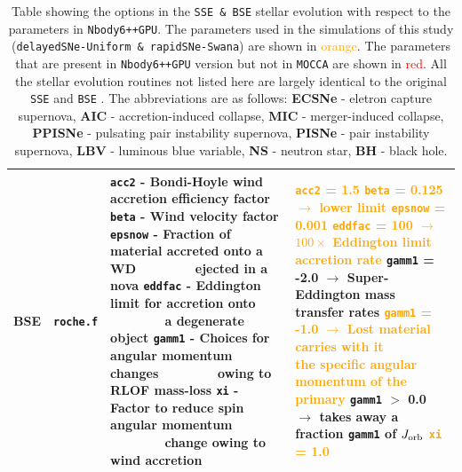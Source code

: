 \begin{landscape}
\begin{table}
\begin{tabular}{|l|l|l|l|}
				\hline \textbf{BSE} & \texttt{roche.f} & \makecell[l]{\texttt{acc2} - Bondi-Hoyle wind accretion efficiency factor \\ \texttt{beta} - Wind velocity factor \\ \texttt{epsnow} - Fraction of material accreted onto a WD \\ $\qquad\qquad$ ejected in a nova \\ \texttt{eddfac} - Eddington limit for accretion onto \\ $\qquad\qquad$ a degenerate object \\ \texttt{gamm1} - Choices for angular momentum changes \\ $\qquad\qquad$ owing to RLOF mass-loss \\ \texttt{xi} - Factor to reduce spin angular momentum \\ $\qquad\qquad$ change owing to wind accretion} & \makecell[l]{\textcolor{orange}{\texttt{acc2} = 1.5} \cite{BondiHoyle1944} \\ \textcolor{orange}{\texttt{beta} = 0.125 $\rightarrow$ lower limit} \cite{Hurley2002}  \\ \textcolor{orange}{\texttt{epsnow} = 0.001} \cite{Hurley2002}\\ \textcolor{orange}{\texttt{eddfac} = 100 $\rightarrow$ $100 \times$ Eddington limit accretion rate} \cite{Hurley2002} \\ \texttt{gamm1} = -2.0 $\rightarrow$  Super-Eddington mass transfer rates \cite{Hurley2002} \\ \textcolor{orange}{\texttt{gamm1} = -1.0 $\rightarrow$ Lost material carries with it} \\  $\qquad\qquad$ \textcolor{orange}{the specific angular momentum of the primary} \cite{Hurley2002} \\ \texttt{gamm1} $>$ 0.0  $\rightarrow$ takes away a fraction \texttt{gamm1} of $J_{\rm orb}$ \cite{Hurley2002}\\ \textcolor{orange}{\texttt{xi} = 1.0} \cite{Hurley2002}}\\ 
				\hline \hline
			\end{tabular}
			\caption{Table showing the options in the \texttt{SSE \& BSE} stellar evolution with respect to the parameters in \texttt{Nbody6++GPU}. The parameters used in the simulations of this study (\texttt{delayedSNe-Uniform \& rapidSNe-Swana}) are shown in \textcolor{orange}{orange}. The parameters that are present in \texttt{Nbody6++GPU} version but not in \texttt{MOCCA} are shown in \textcolor{red}{red}. All the stellar evolution routines not listed here are largely identical to the original \texttt{SSE} and \texttt{BSE} \cite{Hurley2000,Hurley2002}. The abbreviations are as follows: \textbf{ECSNe} - eletron capture supernova, \textbf{AIC} - accretion-induced collapse, \textbf{MIC} - merger-induced collapse, \textbf{PPISNe} - pulsating pair instability supernova, \textbf{PISNe} - pair instability supernova, \textbf{LBV} - luminous blue variable, \textbf{NS} - neutron star, \textbf{BH} - black hole.}
			\label{Nbody6++GPU_Stellar_evolution_levels_literature}
		\end{table}
	\end{landscape}
	
